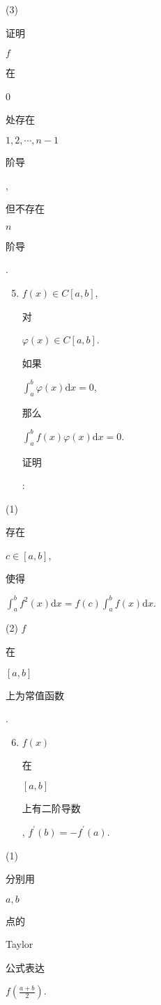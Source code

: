 \documentclass[10pt]{article}
\begin{document}
(3) \begin{CJK}{UTF8}{mj}证明\end{CJK} $f$ \begin{CJK}{UTF8}{mj}在\end{CJK} 0 \begin{CJK}{UTF8}{mj}处存在\end{CJK} $1,2, \cdots, n-1$ \begin{CJK}{UTF8}{mj}阶导\end{CJK}, \begin{CJK}{UTF8}{mj}但不存在\end{CJK} $n$ \begin{CJK}{UTF8}{mj}阶导\end{CJK}.

\begin{enumerate}
  \setcounter{enumi}{4}
  \item $f(x) \in C[a, b]$, \begin{CJK}{UTF8}{mj}对\end{CJK} $\varphi(x) \in C[a, b]$. \begin{CJK}{UTF8}{mj}如果\end{CJK} $\int_{a}^{b} \varphi(x) \mathrm{d} x=0$, \begin{CJK}{UTF8}{mj}那么\end{CJK} $\int_{a}^{b} f(x) \varphi(x) \mathrm{d} x=0$. \begin{CJK}{UTF8}{mj}证明\end{CJK}:
\end{enumerate}
(1) \begin{CJK}{UTF8}{mj}存在\end{CJK} $c \in[a, b]$, \begin{CJK}{UTF8}{mj}使得\end{CJK} $\int_{a}^{b} f^{2}(x) \mathrm{d} x=f(c) \int_{a}^{b} f(x) \mathrm{d} x$.

(2) $f$ \begin{CJK}{UTF8}{mj}在\end{CJK} $[a, b]$ \begin{CJK}{UTF8}{mj}上为常值函数\end{CJK}.

\begin{enumerate}
  \setcounter{enumi}{5}
  \item $f(x)$ \begin{CJK}{UTF8}{mj}在\end{CJK} $[a, b]$ \begin{CJK}{UTF8}{mj}上有二阶导数\end{CJK}, $f^{\prime}(b)=-f^{\prime}(a)$.
\end{enumerate}
(1) \begin{CJK}{UTF8}{mj}分别用\end{CJK} $a, b$ \begin{CJK}{UTF8}{mj}点的\end{CJK} Taylor \begin{CJK}{UTF8}{mj}公式表达\end{CJK} $f\left(\frac{a+b}{2}\right)$.
\end{document}

